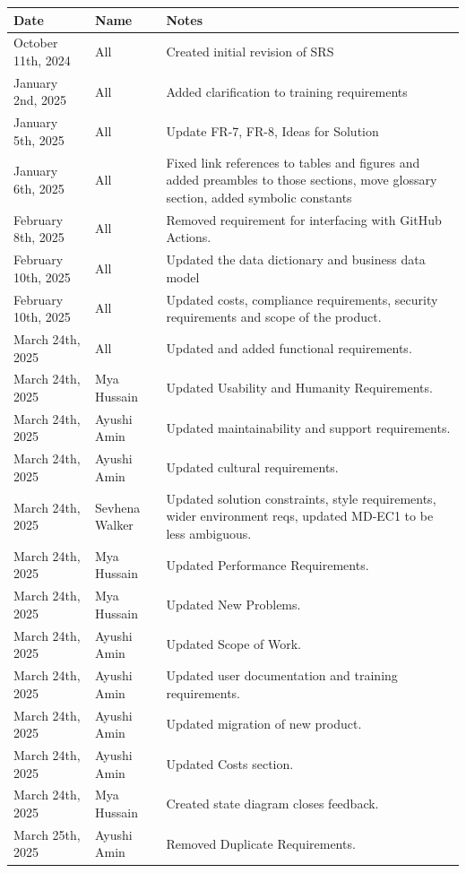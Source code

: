 \documentclass[12pt]{article}
\begin{document}
\begin{tabularx}{\textwidth}{p{3.7cm}>{\raggedright\arraybackslash}p{1.8cm}X}
  \toprule {\textbf{Date}} & {\textbf{Name}} & {\textbf{Notes}}\\
  \midrule
  October 11th, 2024 & All & Created initial revision of SRS\\
  January 2nd, 2025 & All & Added clarification to training requirements\\
  January 5th, 2025 & All & Update FR-7, FR-8, Ideas for Solution \\
  January 6th, 2025 & All & Fixed link references to tables and
  figures and added preambles to those sections, move glossary
  section, added symbolic constants\\
  February 8th, 2025 & All & Removed requirement for interfacing with
  GitHub Actions.\\
  February 10th, 2025 & All & Updated the data dictionary and
  business data model \\
  February 10th, 2025 & All & Updated costs, compliance requirements,
  security requirements and scope of the product. \\
  March 24th, 2025 & All & Updated and added functional requirements. \\
  March 24th, 2025 & Mya Hussain & Updated Usability and Humanity
  Requirements. \\
  March 24th, 2025 & Ayushi Amin & Updated maintainability and
  support requirements. \\
  March 24th, 2025 & Ayushi Amin & Updated cultural requirements. \\
  March 24th, 2025 & Sevhena Walker & Updated solution constraints,
  style requirements, wider environment reqs, updated MD-EC1 to be
  less ambiguous. \\
  March 24th, 2025 & Mya Hussain & Updated Performance Requirements. \\
  March 24th, 2025 & Mya Hussain & Updated New Problems. \\
  March 24th, 2025 & Ayushi Amin & Updated Scope of Work. \\
  March 24th, 2025 & Ayushi Amin & Updated user documentation and
  training requirements. \\
  March 24th, 2025 & Ayushi Amin & Updated migration of new product. \\
  March 24th, 2025 & Ayushi Amin & Updated Costs section. \\
  March 24th, 2025 & Mya Hussain & Created state diagram closes feedback. \\
  March 25th, 2025 & Ayushi Amin & Removed Duplicate Requirements.\\
  \bottomrule
\end{tabularx}
\end{document}
